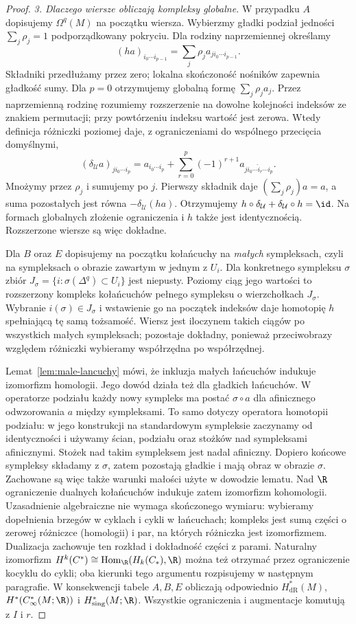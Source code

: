 \begin{proof}
\emph{3. Dlaczego wiersze obliczają kompleksy globalne.}
W przypadku $A$ dopisujemy $\Omega^q(M)$ na początku
wiersza. Wybierzmy gładki podział jedności
$\sum_j\rho_j=1$ podporządkowany pokryciu. Dla rodziny
naprzemiennej określamy
\[
 (ha)_{i_0\cdots i_{p-1}}
   =\sum_j\rho_j a_{j i_0\cdots i_{p-1}}.
\]
Składniki przedłużamy przez zero; lokalna skończoność
nośników zapewnia gładkość sumy. Dla $p=0$ otrzymujemy
globalną formę $\sum_j\rho_j a_j$.
Przez naprzemienną rodzinę rozumiemy rozszerzenie
na dowolne kolejności indeksów ze znakiem permutacji;
przy powtórzeniu indeksu wartość jest zerowa.
Wtedy definicja różniczki poziomej daje, z ograniczeniami
do wspólnego przecięcia domyślnymi,
\[
 (\delta_{\mathcal U}a)_{j i_0\cdots i_p}
 =a_{i_0\cdots i_p}
  +\sum_{r=0}^p(-1)^{r+1}a_{j i_0\cdots\widehat i_r\cdots i_p}.
\]
Mnożymy przez $\rho_j$ i sumujemy po $j$.
Pierwszy składnik daje $(\sum_j\rho_j)a=a$, a suma
pozostałych jest równa $-\delta_{\mathcal U}(ha)$.
Otrzymujemy $h\circ\delta_{\mathcal U}+\delta_{\mathcal U}\circ h=\id$.
Na formach globalnych złożenie
ograniczenia i $h$ także jest identycznością.
Rozszerzone wiersze są więc dokładne.

Dla $B$ oraz $E$ dopisujemy na początku kołańcuchy
na \emph{małych} sympleksach, czyli na sympleksach
o obrazie zawartym w jednym z $U_i$. Dla konkretnego
sympleksu $\sigma$ zbiór
$J_\sigma=\{i:\sigma(\Delta^q)\subset U_i\}$ jest
niepusty. Poziomy ciąg jego wartości to rozszerzony
kompleks kołańcuchów pełnego sympleksu o wierzchołkach
$J_\sigma$. Wybranie $i(\sigma)\in J_\sigma$ i wstawienie
go na początek indeksów daje homotopię $h$ spełniającą
tę samą tożsamość. Wiersz jest iloczynem takich ciągów
po wszystkich małych sympleksach; pozostaje dokładny,
ponieważ przeciwobrazy względem różniczki wybieramy
współrzędna po współrzędnej.

Lemat~\ref{lem:male-lancuchy} mówi, że inkluzja małych
łańcuchów indukuje izomorfizm homologii. Jego dowód
działa też dla gładkich łańcuchów. W operatorze podziału
każdy nowy sympleks ma postać $\sigma\circ a$ dla
afinicznego odwzorowania $a$ między sympleksami.
To samo dotyczy operatora homotopii podziału: w jego
konstrukcji na standardowym sympleksie zaczynamy od
identyczności i używamy ścian, podziału oraz stożków
nad sympleksami afinicznymi. Stożek nad takim sympleksem
jest nadal afiniczny. Dopiero końcowe sympleksy składamy
z $\sigma$, zatem pozostają gładkie i mają obraz
w obrazie $\sigma$. Zachowane są więc także warunki
małości użyte w dowodzie lematu.
Nad $\R$ ograniczenie dualnych kołańcuchów indukuje
zatem izomorfizm kohomologii. Uzasadnienie algebraiczne
nie wymaga skończonego wymiaru: wybieramy dopełnienia
brzegów w cyklach i cykli w łańcuchach; kompleks jest
sumą części o zerowej różniczce (homologii) i par,
na których różniczka jest izomorfizmem. Dualizacja
zachowuje ten rozkład i dokładność części z parami.
Naturalny izomorfizm
$H^k(C^*)\cong\operatorname{Hom}_{\R}(H_k(C_*),\R)$
można też otrzymać przez ograniczenie kocyklu do cykli;
oba kierunki tego argumentu rozpisujemy w następnym paragrafie.
W konsekwencji tabele $A,B,E$ obliczają odpowiednio
$H^*_{\mathrm{dR}}(M)$, $H^*(C_\infty^*(M;\R))$
i $H^*_{\mathrm{sing}}(M;\R)$.
Wszystkie ograniczenia i augmentacje komutują z $I$ i $r$.


\end{proof}
